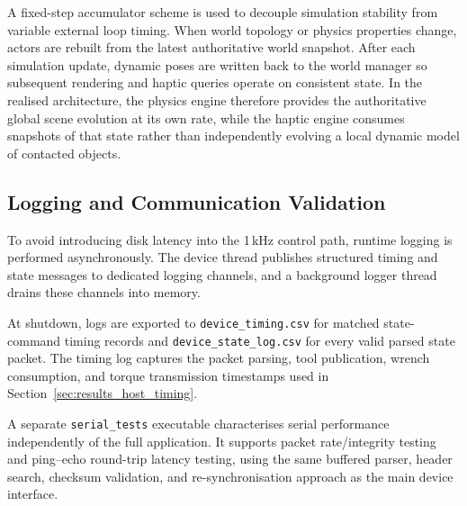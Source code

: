 A fixed-step accumulator scheme is used to decouple simulation stability from variable external loop timing. When world topology or physics properties change, actors are rebuilt from the latest authoritative world snapshot. After each simulation update, dynamic poses are written back to the world manager so subsequent rendering and haptic queries operate on consistent state. In the realised architecture, the physics engine therefore provides the authoritative global scene evolution at its own rate, while the haptic engine consumes snapshots of that state rather than independently evolving a local dynamic model of contacted objects.

\subsection{Logging and Communication Validation} \label{sec:logging_communication_validation}

To avoid introducing disk latency into the 1\,kHz control path, runtime logging is performed asynchronously. The device thread publishes structured timing and state messages to dedicated logging channels, and a background logger thread drains these channels into memory.

At shutdown, logs are exported to \texttt{device\_timing.csv} for matched state-command timing records and \texttt{device\_state\_log.csv} for every valid parsed state packet. The timing log captures the packet parsing, tool publication, wrench consumption, and torque transmission timestamps used in Section~\ref{sec:results_host_timing}.

A separate \texttt{serial\_tests} executable characterises serial performance independently of the full application. It supports packet rate/integrity testing and ping--echo round-trip latency testing, using the same buffered parser, header search, checksum validation, and re-synchronisation approach as the main device interface.
